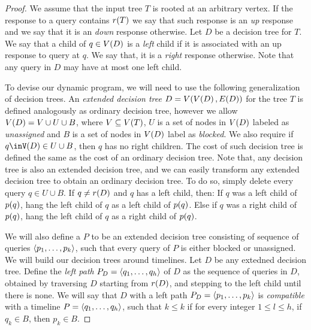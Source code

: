 \begin{theorem}
\begin{proof}
We assume that the input tree $T$ is rooted at an arbitrary vertex. If the response to a query contains $r\mathopen{}\left( T \right)$ we say that such response is an \textit{up} response and we say that it is an \textit{down} response otherwise. Let $D$ be a decision tree for $T$. We say that a child of $q\in V\mathopen{}\left( D \right)$ is a \textit{left} child if it is associated with an up response to query at $q$. We say that, it is a \textit{right} response otherwise. Note that any query in $D$ may have at most one left child.

To devise our dynamic program, we will need to use the following generalization of decision trees. An \textit{extended decision tree} $D=V\mathopen{}\left( V\mathopen{}\left( D \right), E\mathopen{}\left( D \right) \right)$ for the tree $T$ is defined analogously as ordinary decision tree, however we allow $V\mathopen{}\left( D \right)=V\cup U \cup B$, where $V\subseteq V\mathopen{}\left( T \right)$, $U$ is a set of nodes in $V\mathopen{}\left( D \right)$ labeled as \textit{unassigned} and $B$ is a set of nodes in $V\mathopen{}\left( D \right)$ label as \textit{blocked}. We also require if $q\inV\br{D}\in U\cup B$, then $q$ has no right children. The cost of such decision tree is defined the same as the cost of an ordinary decision tree. Note that, any decision tree is also an extended decision tree, and we can easily transform any extended decision tree to obtain an ordinary decision tree. To do so, simply delete every query $q\in U\cup B$. If $q\neq r\mathopen{}\left( D \right)$ and $q$ has a left child, then: If $q$ was a left child of $p\mathopen{}\left( q \right)$, hang the left child of $q$ as a left child of $p\mathopen{}\left( q \right)$. Else if $q$ was a right child of $p\mathopen{}\left( q \right)$, hang the left child of $q$ as a right child of $p\mathopen{}\left( q \right)$.

We will also define a  $P$ to be an extended decision tree consisting of sequence of queries $\mathopen{}\langle p_1,\dots,p_k \rangle$, such that every query of $P$ is either blocked or unassigned. We will build our decision trees around timelines. Let $D$ be any extedned decision tree. Define the \textit{left path} $P_D=\mathopen{}\langle q_1,\dots,q_h \rangle$ of $D$ as the sequence of queries in $D$, obtained by traversing $D$ starting from $r\mathopen{}\left( D \right)$, and stepping to the left child until there is none. We will say that $D$ with a left path $P_D=\mathopen{}\langle p_1,\dots,p_k \rangle$ is \textit{compatible} with a timeline $P=\mathopen{}\langle q_1,\dots,q_h \rangle$, such that $k\leq k$ if for every integer $1\leq l \leq h$, if $q_k\in B$, then $p_k\in B$. 


\end{proof}
\end{theorem}
